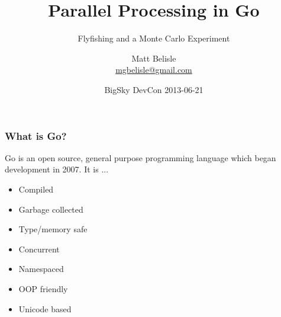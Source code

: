 \documentclass{beamer}
\title{Parallel Processing in Go}
\subtitle{Flyfishing and a Monte Carlo Experiment}
\author{Matt Belisle\\ \href{mailto:mgbelisle@gmail.com}{mgbelisle@gmail.com}}
\date{BigSky DevCon 2013-06-21}
\begin{document}
\begin{frame}
  \titlepage
\end{frame}
\begin{frame}
  \frametitle{What is Go?}

  Go is an open source, general purpose programming language which
  began development in 2007.  It is ...
  
  \begin{itemize}
    \item Compiled
    \item Garbage collected
    \item Type/memory safe
    \item Concurrent
    \item Namespaced
    \item OOP friendly
    \item Unicode based
  \end{itemize}
\end{frame}
\end{document}

